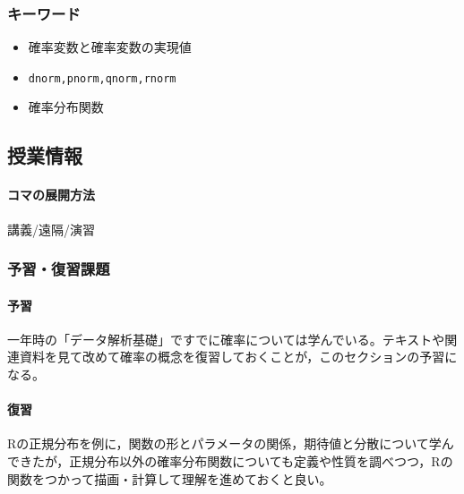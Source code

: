 \subsubsection{キーワード}
\begin{itemize}
	\item 確率変数と確率変数の実現値
	\item \verb|dnorm,pnorm,qnorm,rnorm|
	\item 確率分布関数
\end{itemize}
\subsection{授業情報}
\paragraph{コマの展開方法}
講義/遠隔/演習
\subsubsection{予習・復習課題}
\paragraph{予習} 一年時の「データ解析基礎」ですでに確率については学んでいる。テキストや関連資料を見て改めて確率の概念を復習しておくことが，このセクションの予習になる。
\paragraph{復習} Rの正規分布を例に，関数の形とパラメータの関係，期待値と分散について学んできたが，正規分布以外の確率分布関数についても定義や性質を調べつつ，Rの関数をつかって描画・計算して理解を進めておくと良い。